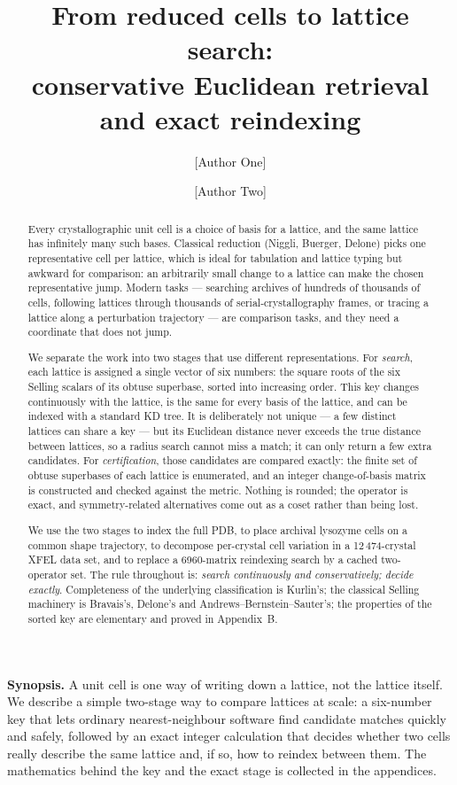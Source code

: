 \documentclass[11pt]{article}
\title{\bfseries From reduced cells to lattice search:\\
conservative Euclidean retrieval and exact reindexing}
\author[1]{[Author One]}
\author[1]{[Author Two]}
\affil[1]{[Affiliation], [City], [Country]}
\date{}
\begin{document}
\maketitle

\begin{center}
\begin{minipage}{0.92\textwidth}
\small\noindent\textbf{Synopsis.}
A unit cell is one way of writing down a lattice, not the lattice itself. We describe a simple two-stage way to compare lattices at scale: a six-number key that lets ordinary nearest-neighbour software find candidate matches quickly and safely, followed by an exact integer calculation that decides whether two cells really describe the same lattice and, if so, how to reindex between them. The mathematics behind the key and the exact stage is collected in the appendices.
\end{minipage}
\end{center}

\begin{abstract}
Every crystallographic unit cell is a choice of basis for a lattice, and the same lattice has infinitely many such bases. Classical reduction (Niggli, Buerger, Delone) picks one representative cell per lattice, which is ideal for tabulation and lattice typing but awkward for comparison: an arbitrarily small change to a lattice can make the chosen representative jump. Modern tasks --- searching archives of hundreds of thousands of cells, following lattices through thousands of serial-crystallography frames, or tracing a lattice along a perturbation trajectory --- are comparison tasks, and they need a coordinate that does not jump.

We separate the work into two stages that use different representations. For \emph{search}, each lattice is assigned a single vector of six numbers: the square roots of the six Selling scalars of its obtuse superbase, sorted into increasing order. This key changes continuously with the lattice, is the same for every basis of the lattice, and can be indexed with a standard KD tree. It is deliberately not unique --- a few distinct lattices can share a key --- but its Euclidean distance never exceeds the true distance between lattices, so a radius search cannot miss a match; it can only return a few extra candidates. For \emph{certification}, those candidates are compared exactly: the finite set of obtuse superbases of each lattice is enumerated, and an integer change-of-basis matrix is constructed and checked against the metric. Nothing is rounded; the operator is exact, and symmetry-related alternatives come out as a coset rather than being lost.

We use the two stages to index the full PDB, to place archival lysozyme cells on a common shape trajectory, to decompose per-crystal cell variation in a 12\,474-crystal XFEL data set, and to replace a 6960-matrix reindexing search by a cached two-operator set. The rule throughout is: \emph{search continuously and conservatively; decide exactly}. Completeness of the underlying classification is Kurlin's; the classical Selling machinery is Bravais's, Delone's and Andrews--Bernstein--Sauter's; the properties of the sorted key are elementary and proved in Appendix~B.
\end{abstract}
\end{document}
